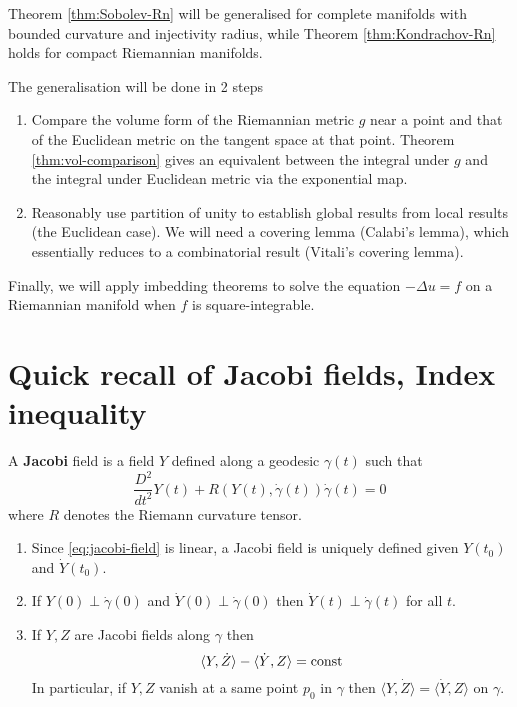 \documentclass[11pt]{article}
\begin{document}
Theorem \ref{thm:Sobolev-Rn} will be generalised for complete manifolds with bounded curvature and
injectivity radius, while Theorem \ref{thm:Kondrachov-Rn} holds for compact Riemannian manifolds.

The generalisation will be done in 2 steps
\begin{enumerate}
\item Compare the volume form of the Riemannian metric \(g\) near a point and
that of the Euclidean metric on the tangent space at that point. Theorem
\ref{thm:vol-comparison} gives an equivalent between the integral under \(g\) and the integral
under Euclidean metric via the exponential map.
\item Reasonably use partition of unity to establish global results from local results (the
Euclidean case). We will need a covering lemma (Calabi's lemma), which essentially reduces to a
combinatorial result (Vitali's covering lemma).
\end{enumerate}

Finally, we will apply imbedding theorems to solve the equation \(-\Delta u = f\) on a
Riemannian manifold when \(f\) is square-integrable.
\section{Quick recall of Jacobi fields, Index inequality}
\label{sec:org0d6bfe8}
\begin{definition}
A \textbf{Jacobi} field is a field \(Y\) defined along a geodesic \(\gamma(t)\) such that
\begin{equation}
\label{eq:jacobi-field}
 \frac{D^2}{dt^2}Y(t) + R(Y(t),\dot\gamma(t))\dot\gamma(t) = 0
\end{equation}
where \(R\) denotes the Riemann curvature tensor.
\end{definition}

\begin{remark}
\label{rem:obvious-jacobi}
\begin{enumerate}
\item Since \eqref{eq:jacobi-field} is linear, a Jacobi field is uniquely defined given \(Y(t_0)\) and \(\dot Y(t_0)\).
\item If \(Y(0) \perp \dot\gamma(0)\) and \(\dot Y(0) \perp \dot\gamma(0)\) then \(\dot Y(t)
   \perp \dot\gamma(t)\) for all \(t\).
\item If \(Y,Z\) are Jacobi fields along \(\gamma\) then 
\[
    \langle Y, \dot Z \rangle - \langle \dot Y, Z \rangle = \mathop{\rm const }\nolimits
   \]
In particular, if \(Y,Z\) vanish at a same point \(p_0\) in \(\gamma\) then
\(\langle Y,\dot Z \rangle = \langle \dot Y, Z \rangle\) on \(\gamma\).
\end{enumerate}
\end{remark}
\end{document}

